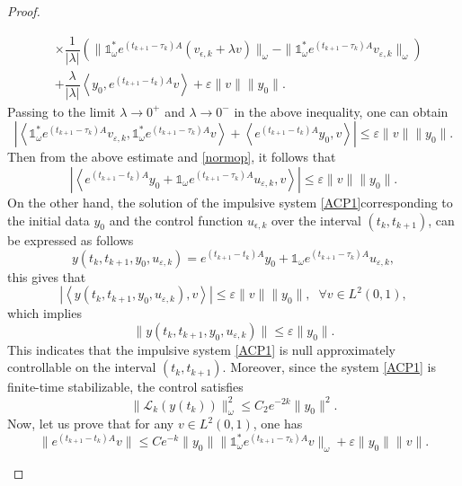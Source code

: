 \documentclass[sn-mathphys]{sn-jnl}
\begin{document}
\begin{proof}
\begin{enumerate}
\begin{align*}
        &\times \dfrac{1}{\left\lvert \lambda \right\rvert} \left(\| \mathds{1}_{\omega}^{*} e^{(t_{k+1}-\tau_k)A} (v_{\epsilon,k}+\lambda v)\|_{\omega} -\| \mathds{1}_{\omega}^{*} e^{(t_{k+1}-\tau_k)A} v_{\varepsilon,k}\|_{\omega} \right)\nonumber\\
        &+ \dfrac{\lambda}{\left\lvert\lambda \right\rvert} \left\langle y_0, e^{(t_{k+1}-t_k)A} v \right\rangle +  \varepsilon \|v\| \|y_0\|.
    \end{align*}
    Passing to the limit $\lambda \to 0^{+}$ and $\lambda \to 0^{-}$ in the above inequality, one can obtain 
    \begin{equation*}
        \left\lvert \left\langle \mathds{1}_{\omega}^{*} e^{(t_{k+1}-\tau_k)A} v_{\varepsilon,k} , \mathds{1}_{\omega}^{*} e^{(t_{k+1}-\tau_k)A} v\right\rangle+ \left\langle e^{(t_{k+1}-t_k)A} y_0,  v \right\rangle \right\rvert \leq \varepsilon \| v\| \|y_0\|.
    \end{equation*}
    Then from the above estimate and \eqref{normop}, it follows that
    \begin{equation}
        \left\lvert \left\langle e^{(t_{k+1}-t_k)A} y_0 + \mathds{1}_{\omega} e^{(t_{k+1}-\tau_k)A} u_{\varepsilon,k} , v \right\rangle \right\rvert \leq \varepsilon \| v \| \|y_0\|.
    \end{equation}
    On the other hand, the solution of the impulsive system \eqref{ACP1}corresponding to the initial data $y_0$ and the control function $u_{\epsilon,k}$ over the interval $(t_k, t_{k+1})$, can be expressed as follows
    \[y(t_k,t_{k+1},y_0,u_{\varepsilon,k})= e^{(t_{k+1}-t_k)A} y_0 + \mathds{1}_{\omega} e^{(t_{k+1}-\tau_k)A} u_{\varepsilon,k},\]
    this gives that
    \[\left\lvert \left\langle y(t_k,t_{k+1},y_0,u_{\varepsilon,k}) , v \right\rangle \right\rvert \leq \varepsilon \| v \| \|y_0\|, \;\;\forall v \in L^2(0,1),\]
    which implies 
    \begin{equation}\label{eqq8}
        \| y(t_k,t_{k+1}, y_0, u_{\varepsilon,k}) \| \leq \varepsilon \|y_0\|.
    \end{equation}
    This indicates that the impulsive system \eqref{ACP1} is null approximately controllable on the interval $(t_k, t_{k+1})$. Moreover, since the system \eqref{ACP1} is finite-time stabilizable, the control satisfies
    \[ \| \mathcal{L}_k(y(t_k)) \|^2_{\omega} \leq C_2 e^{-2k} \|y_0\|^2.\]
    Now, let us prove that for any $v \in L^2(0,1)$, one has
    \begin{equation}\label{eqq13}
        \| e^{(t_{k+1}-t_k)A} v \| \leq C e^{-k} \|y_0\|\| \mathds{1}_{\omega}^{*} e^{(t_{k+1}-\tau_k)A} v \|_{\omega} + \varepsilon\|y_0\| \| v\|.

\end{equation}
\end{enumerate}
\end{proof}
\end{document}
